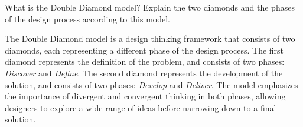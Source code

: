 \begin{ejercicio}
    What is the Double Diamond model? Explain the two diamonds and the phases of the design process according to this model.

    The Double Diamond model is a design thinking framework that consists of two diamonds, each representing a different phase of the design process. The first diamond represents the definition of the problem, and consists of two phases: \textit{Discover} and \textit{Define}. The second diamond represents the development of the solution, and consists of two phases: \textit{Develop} and \textit{Deliver}. The model emphasizes the importance of divergent and convergent thinking in both phases, allowing designers to explore a wide range of ideas before narrowing down to a final solution.
\end{ejercicio}